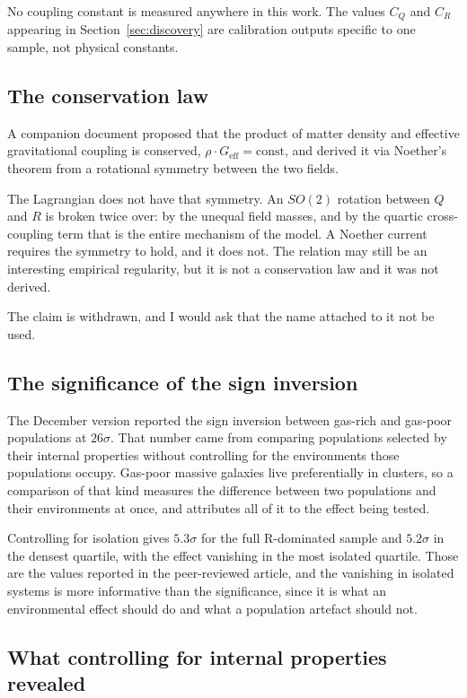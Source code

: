 \documentclass[12pt,a4paper]{article}
\begin{document}
No coupling constant is measured anywhere in this work. The values $C_Q$ and $C_R$ appearing in Section~\ref{sec:discovery} are calibration outputs specific to one sample, not physical constants.

\subsection{The conservation law}

A companion document proposed that the product of matter density and effective gravitational coupling is conserved, $\rho \cdot G_{\mathrm{eff}} = \mathrm{const}$, and derived it via Noether's theorem from a rotational symmetry between the two fields.

The Lagrangian does not have that symmetry. An $SO(2)$ rotation between $Q$ and $R$ is broken twice over: by the unequal field masses, and by the quartic cross-coupling term that is the entire mechanism of the model. A Noether current requires the symmetry to hold, and it does not. The relation may still be an interesting empirical regularity, but it is not a conservation law and it was not derived.

The claim is withdrawn, and I would ask that the name attached to it not be used.

\subsection{The significance of the sign inversion}

The December version reported the sign inversion between gas-rich and gas-poor populations at $26\sigma$. That number came from comparing populations selected by their internal properties without controlling for the environments those populations occupy. Gas-poor massive galaxies live preferentially in clusters, so a comparison of that kind measures the difference between two populations and their environments at once, and attributes all of it to the effect being tested.

Controlling for isolation gives $5.3\sigma$ for the full R-dominated sample and $5.2\sigma$ in the densest quartile, with the effect vanishing in the most isolated quartile. Those are the values reported in the peer-reviewed article, and the vanishing in isolated systems is more informative than the significance, since it is what an environmental effect should do and what a population artefact should not.

\subsection{What controlling for internal properties revealed}
\end{document}
